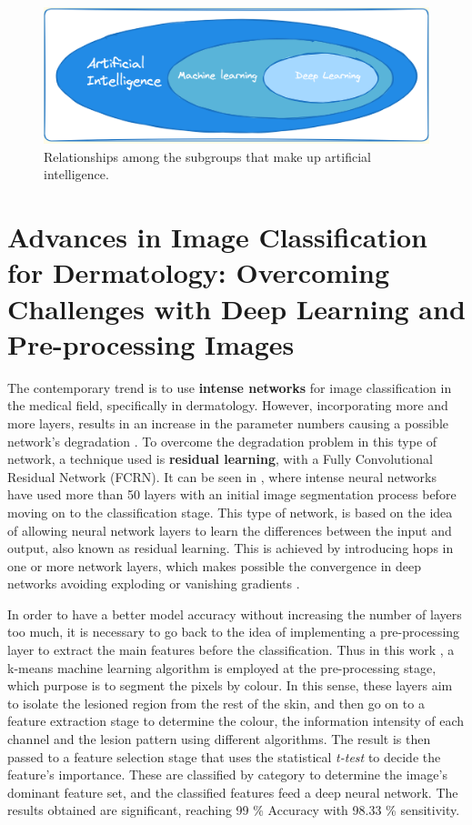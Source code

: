 \begin{figure}[ht]
    \begin{center}
        \includegraphics[scale=0.60]{images/AI_Group.png}
        \caption{Relationships among the subgroups that make up artificial intelligence.}
    \label{fig:IA Subgroup}    
    \end{center}
\end{figure}


\section{Advances in Image Classification for Dermatology: Overcoming Challenges with Deep Learning and  Pre-processing Images}

The contemporary trend is to use  \textbf{intense networks} for image classification in the medical field, specifically in dermatology. However, incorporating more and more layers, results in an increase in the parameter numbers causing a possible network's degradation \cite{roy_effects_2023}. To overcome the degradation problem in this type of network, a technique used is \textbf{residual learning}, with a Fully Convolutional 
Residual Network (FCRN). It can be seen in  \cite{7792699}, where intense neural networks have used more than 50 layers with an initial image segmentation process before moving on to the classification stage.  This type of network, \cite{laina_deeper_2016} is based on the idea of allowing neural network layers to learn the differences between the input and output, also known as residual learning. This is achieved by introducing hops in one or more network layers, which makes possible the convergence in deep networks avoiding exploding or vanishing gradients \cite{wong_what_2021}.

In order to have a better model accuracy without increasing the number of layers too much,  it is necessary to go back to the idea of implementing a pre-processing layer to extract the main features before the classification. Thus in this work \cite{thamizhamuthu_deep_2023}, a k-means machine learning algorithm is employed at the pre-processing stage, which purpose is to segment the pixels by colour. In this sense, these layers aim to isolate the lesioned region from the rest of the skin, and then go on to a feature extraction stage to determine the colour, the information intensity of each channel and the lesion pattern using different algorithms. The result is then passed to a feature selection stage that uses the statistical \textit{t-test} to decide the feature's importance. These are classified by category to determine the image's dominant feature set, and the classified features feed a deep neural network. The results obtained are significant, reaching 99 \% Accuracy with 98.33 \% sensitivity. 

